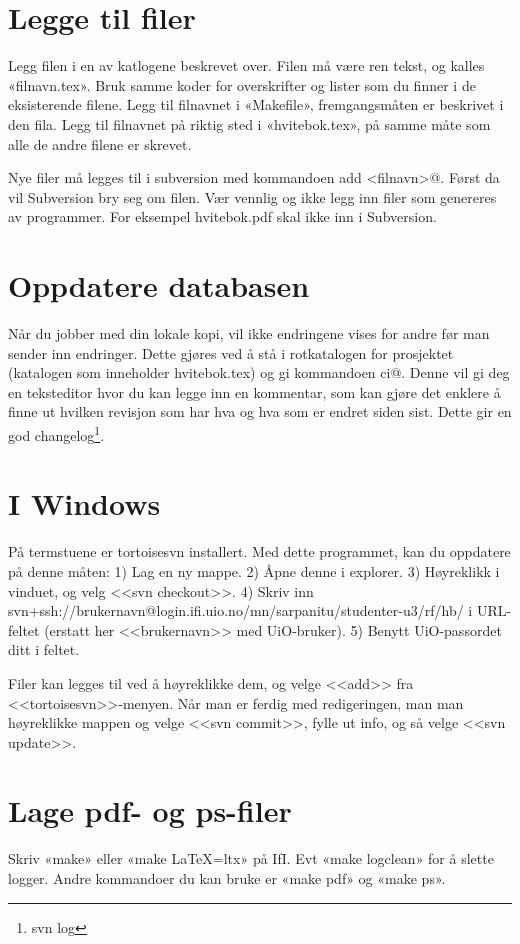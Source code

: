 \documentclass[11pt,norsk,a4paper,pointlessnumbers]{scrbook}
\begin{document}
\section{Legge til filer}
Legg filen i en av katlogene beskrevet over. Filen må være ren tekst,
og kalles «filnavn.tex». Bruk samme koder for overskrifter og lister
som du finner i de eksisterende filene. Legg til filnavnet i «Makefile»,
fremgangsmåten er beskrivet i den fila. Legg til filnavnet på riktig
sted i «hvitebok.tex», på samme måte som alle de andre filene er skrevet.

Nye filer må legges til i subversion med kommandoen \verb@svn add <filnavn>@.
Først da vil Subversion bry seg om filen. Vær vennlig og ikke legg inn filer
som genereres av programmer. For eksempel hvitebok.pdf skal ikke inn i Subversion.

\section{Oppdatere databasen}
Når du jobber med din lokale kopi, vil ikke endringene vises for andre før man
sender inn endringer. Dette gjøres ved å stå i rotkatalogen for prosjektet (katalogen
som inneholder hvitebok.tex) og gi kommandoen \verb@svn ci@. Denne vil gi deg en teksteditor
hvor du kan legge inn en kommentar, som kan gjøre det enklere å finne ut hvilken revisjon
som har hva og hva som er endret siden sist. Dette gir en god changelog\footnote{svn log}.

\section{I Windows}
På termstuene er tortoisesvn installert. Med dette programmet, kan du oppdatere på denne måten:
1) Lag en ny mappe. 2) Åpne denne i explorer. 3) Høyreklikk i vinduet, og velg <<svn checkout>>.
4) Skriv inn svn+ssh://brukernavn@login.ifi.uio.no/mn/sarpanitu/studenter-u3/rf/hb/ i URL-feltet (erstatt
her <<brukernavn>> med UiO-bruker). 5) Benytt UiO-passordet ditt i feltet.

Filer kan legges til ved å høyreklikke dem, og velge <<add>> fra <<tortoisesvn>>-menyen. Når man er
ferdig med redigeringen, man man høyreklikke mappen og velge <<svn commit>>, fylle ut info, og så
velge <<svn update>>.

\section{Lage pdf- og ps-filer}
Skriv «make» eller «make LaTeX=ltx» på IfI.
Evt «make logclean» for å slette logger.
Andre kommandoer du kan bruke er «make pdf» og «make ps».
\end{document}
